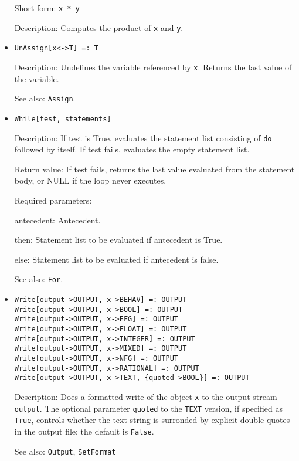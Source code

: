 \begin{itemize}
\bd
\item
[Short form:] \verb+x * y+
\item
[Description:] Computes the product of \verb+x+ and \verb+y+.
\ed


\item
\protect \large \begin{verbatim}
UnAssign[x<->T] =: T
\end{verbatim}\normalsize

\bd
\item
[Description:] Undefines the variable referenced by \verb+x+.  Returns the
last value of the variable.
\item
[See also:] {\tt Assign}.
\ed



\item 
\protect \large \begin{verbatim}
While[test, statements]
\end{verbatim} \normalsize
  
\bd
\item
[Description:] If test is True, evaluates the statement list consisting of
\verb+do+ followed by itself.  If test fails, evaluates the empty
statement list.
\item
[Return value:] If test fails, returns the last value evaluated from the
statement body, or NULL if the loop never executes.

\item
[Required parameters:]\hfil\null
\bd
\item
[antecedent:] Antecedent.  
\item
[then:] Statement list to be evaluated if antecedent is True. 
\item
[else:] Statement list to be evaluated if antecedent is false. 
\ed
\item
[See also:] \verb+For+.
\ed

\item
\protect \large \begin{verbatim}
Write[output->OUTPUT, x->BEHAV] =: OUTPUT 
Write[output->OUTPUT, x->BOOL] =: OUTPUT 
Write[output->OUTPUT, x->EFG] =: OUTPUT
Write[output->OUTPUT, x->FLOAT] =: OUTPUT
Write[output->OUTPUT, x->INTEGER] =: OUTPUT
Write[output->OUTPUT, x->MIXED] =: OUTPUT
Write[output->OUTPUT, x->NFG] =: OUTPUT
Write[output->OUTPUT, x->RATIONAL] =: OUTPUT
Write[output->OUTPUT, x->TEXT, {quoted->BOOL}] =: OUTPUT
\end{verbatim}\normalsize

\bd
\item
[Description:] Does a formatted write of the object \verb+x+ to the
output stream \verb+output+.  The optional parameter \verb+quoted+ to
the {\tt TEXT} version, if specified as \verb+True+, controls whether
the text string is surronded by explicit double-quotes in the output
file; the default is \verb+False+.
\item
[See also:] {\tt Output}, {\tt SetFormat}
\ed




\end{itemize}
